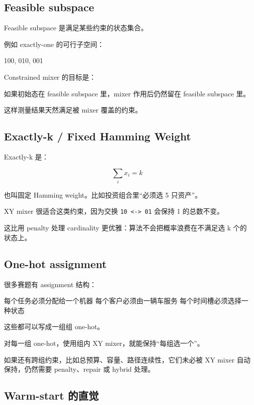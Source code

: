 \documentclass[UTF8,12pt,a4paper]{ctexart}
\begin{document}
\subsection*{Feasible subspace}

Feasible subspace 是满足某些约束的状态集合。

例如 exactly-one 的可行子空间：

\begin{GuideVerbatim}
{100, 010, 001}
\end{GuideVerbatim}

Constrained mixer 的目标是：

\begin{GuideVerbatim}
如果初始态在 feasible subspace 里，mixer 作用后仍然留在 feasible subspace 里。
\end{GuideVerbatim}

这样测量结果天然满足被 mixer 覆盖的约束。

\subsection*{Exactly-k / Fixed Hamming Weight}

Exactly-k 是：

\[
\sum_{i} x_{i} = k
\]

也叫固定 Hamming weight。比如投资组合里“必须选 5 只资产”。

XY mixer 很适合这类约束，因为交换 \texttt{10 <-> 01} 会保持 1 的总数不变。

这比用 penalty 处理 cardinality 更优雅：算法不会把概率浪费在不满足选 k 个的状态上。

\subsection*{One-hot assignment}

很多赛题有 assignment 结构：

\begin{GuideVerbatim}
每个任务必须分配给一个机器
每个客户必须由一辆车服务
每个时间槽必须选择一种状态
\end{GuideVerbatim}

这些都可以写成一组组 one-hot。

对每一组 one-hot，使用组内 XY mixer，就能保持“每组选一个”。

如果还有跨组约束，比如总预算、容量、路径连续性，它们未必被 XY mixer 自动保持，仍然需要 penalty、repair 或 hybrid 处理。

\subsection*{Warm-start 的直觉}
\end{document}
